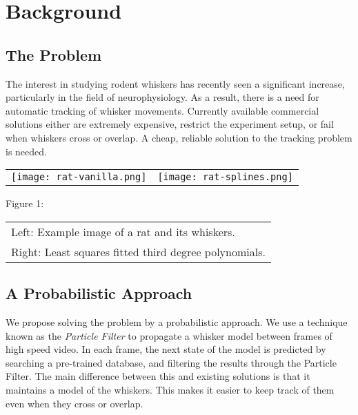 \section*{Background}
\subsection*{The Problem}
The interest in studying rodent whiskers has recently seen a significant increase, particularly in the field of neurophysiology. As a result, there is a need for automatic tracking of whisker movements. Currently available commercial solutions either are extremely expensive, restrict the experiment setup, or fail when whiskers cross or overlap. A cheap, reliable solution to the tracking problem is needed.

\begin{center}
  \begin{tabular}{rl}
    \texttt{[image: rat-vanilla.png]}
    & \texttt{[image: rat-splines.png]}
    \label{fig:rat}
  \end{tabular}
  
  Figure 1:
  \begin{tabular}{l}
    Left: Example image of a rat and its whiskers.\\
    Right: Least squares fitted third degree polynomials.
  \end{tabular}
\end{center}

\subsection*{A Probabilistic Approach}
We propose solving the problem by a probabilistic approach. We use a technique known as the \emph{Particle Filter} to propagate a whisker model between frames of high speed video. In each frame, the next state of the model is predicted by searching a pre-trained database, and filtering the results through the Particle Filter. The main difference between this and existing solutions is that it maintains a model of the whiskers. This makes it easier to keep track of them even when they cross or overlap.
